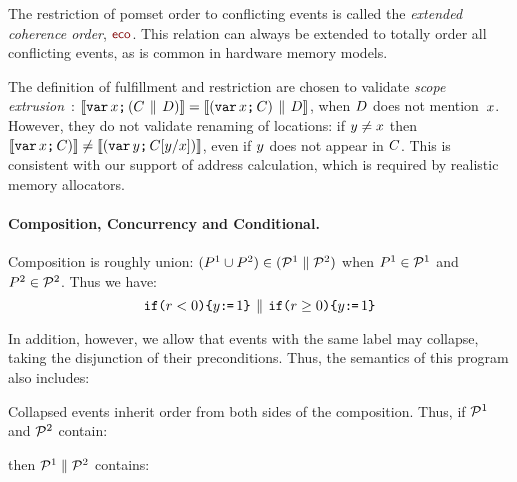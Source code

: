 The restriction of pomset order to conflicting events is called the
\emph{extended coherence order}, $\reco$.  This relation can always be
extended to totally order all conflicting events, as is common in hardware
memory models.

The definition of fulfillment and restriction are chosen to validate
\emph{scope extrusion}~\cite{Milner:1999:CMS:329902}:
$\llbracket\texttt{var}\,x\texttt{;}\,\allowbreak(C\,\mathbin{\|}\,D)\rrbracket=\llbracket(\texttt{var}\,x\texttt{;}\,\allowbreak C)\,\mathbin{\|}\,D\rrbracket$,
when $D$ does not mention~$x$.  However, they do not validate
renaming of locations: if $y\neq x$ then
$\llbracket\texttt{var}\,x\texttt{;}\,\allowbreak C)\rrbracket\neq\llbracket(\texttt{var}\,y\texttt{;}\,\allowbreak C[y/x])\rrbracket$,
even if $y$ does not appear in $C$.  This is consistent with our
support of address calculation, which is required by realistic memory
allocators.

\paragraph{Composition, Concurrency and Conditional.}

Composition is roughly union:
$(P^1\cup P^2) \in (\mathcal{P}^1 \parallel \mathcal{P}^2)$ when
$P^1 \in \mathcal{P}^1$ and $P^2 \in \mathcal{P}^2$.  Thus we have:
\begin{displaymath}
  \texttt{if}\allowbreak\texttt{(}r<0\texttt{)}\allowbreak\texttt{\{} y\texttt{:}\mkern-1mu\texttt{=}\,1\texttt{\}}
  \,\mathbin{\|}\,
  \texttt{if}\allowbreak\texttt{(}r\geq0\texttt{)}\allowbreak\texttt{\{} y\texttt{:}\mkern-1mu\texttt{=}\,1\texttt{\}}
\end{displaymath}
\begin{tikzdisplay}[node distance=1em]
\end{tikzdisplay}
In addition, however, we allow that events with the same label may collapse,
taking the disjunction of their preconditions.  Thus, the semantics of this
program also includes:
\begin{tikzdisplay}[node distance=1em]
\end{tikzdisplay}
Collapsed events inherit order from both sides of the composition.
Thus, if
$\mathcal{P}^1$ and $\mathcal{P}^2$ contain:
\begin{tikzdisplay}[node distance=1em]
\end{tikzdisplay}
then $\mathcal{P}^1 \parallel \mathcal{P}^2$ contains:
\begin{tikzdisplay}[node distance=1em]
\end{tikzdisplay}

